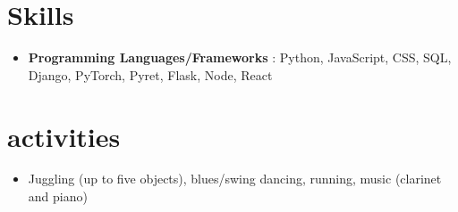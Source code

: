 \documentclass[letterpaper,11pt]{article}
\newcommand{\resumeSubHeadingListStart}{\begin{itemize}[leftmargin=*]}
\newcommand{\resumeSubHeadingListEnd}{\end{itemize}}
\begin{document}
\section{Skills}
  \resumeSubHeadingListStart
    \item{
      \textbf{Programming Languages/Frameworks} {: Python, JavaScript, CSS, SQL, Django, PyTorch, Pyret, Flask, Node, React}
      }
  \resumeSubHeadingListEnd
\section{activities}
    \resumeSubHeadingListStart
    \item{
      Juggling (up to five objects), blues/swing dancing, running, music (clarinet and piano)
      }
  \resumeSubHeadingListEnd
\end{document}
